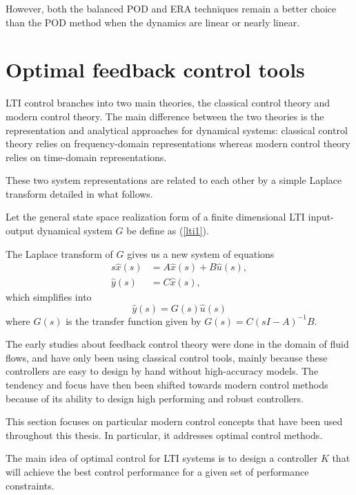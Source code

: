 \documentclass[12pt,lot, lof]{puthesis}
\begin{document}
However, both the balanced POD and ERA techniques remain a better choice than the POD method when the dynamics are linear or nearly linear.

\section{Optimal feedback control tools}
\label{optfed}

LTI control branches into two main theories, the classical control theory and modern control theory. The main difference between the two theories is the representation and analytical approaches for dynamical systems: classical control theory relies on frequency-domain representations whereas modern control theory relies on time-domain representations.
 
 These two system representations are related to each other by a simple Laplace transform detailed in what follows.

Let the general state space realization form of a finite dimensional LTI input-output dynamical system $G$ be define as (\ref{lti1}).

The Laplace transform of $G$ gives us a new system of equations
\begin{equation}
\label{lti2}
\begin{aligned}
	s \hat{x}(s) &= A \hat{x}(s) + B \hat{u}(s),   \\
	\hat{y}(s) &= C \hat{x}(s),
\end{aligned}
\end{equation}
which simplifies into 
%
\begin{equation}
\label{lti3}
\hat{y}(s) = G(s) \hat{u}(s) 
\end{equation}
where $G(s)$ is the transfer function given by $G(s) = C (sI - A)^{-1} B $.

The early studies about feedback control theory were done in the domain of fluid flows, and have only been using classical control tools, mainly because these controllers are easy to design by hand without high-accuracy models. The tendency and focus have then been shifted towards modern control methods because of its ability to design high performing and robust controllers.

This section focuses on particular modern control concepts that have been used throughout this thesis. In particular, it addresses optimal control methods. 

The main idea of optimal control for LTI systems is to design a controller $K$ that will achieve the best control performance for a given set of performance constraints.
\end{document}
